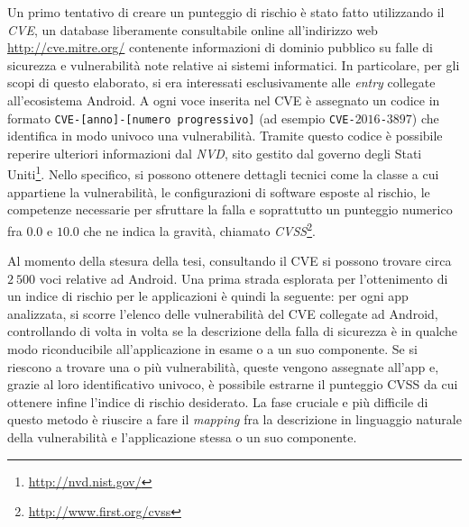 \documentclass[12pt,a4paper,oneside]{article}
\begin{document}
Un primo tentativo di creare un punteggio di rischio è stato fatto utilizzando il \textit{\gls{CVE}}, un database liberamente consultabile online all'indirizzo web \url{http://cve.mitre.org/} contenente informazioni di dominio pubblico su falle di sicurezza e vulnerabilità note relative ai sistemi informatici. In particolare, per gli scopi di questo elaborato, si era interessati esclusivamente alle \textit{entry} collegate all'ecosistema Android. A ogni voce inserita nel \gls{CVE} è assegnato un codice in formato \texttt{CVE-[anno]-[numero progressivo]} (ad esempio \texttt{CVE-$2016$-$3897$}) che identifica in modo univoco una vulnerabilità. Tramite questo codice è possibile reperire ulteriori informazioni dal \textit{\gls{NVD}}, sito gestito dal governo degli Stati Uniti\footnote{\url{http://nvd.nist.gov/}}. Nello specifico, si possono ottenere dettagli tecnici come la classe a cui appartiene la vulnerabilità, le configurazioni di software esposte al rischio, le competenze necessarie per sfruttare la falla e soprattutto un punteggio numerico fra $0.0$ e $10.0$ che ne indica la gravità, chiamato \textit{\gls{CVSS}}\footnote{\url{http://www.first.org/cvss}}.

Al momento della stesura della tesi, consultando il \gls{CVE} si possono trovare circa $2~500$ voci relative ad Android. Una prima strada esplorata per l'ottenimento di un indice di rischio per le applicazioni è quindi la seguente: per ogni app analizzata, si scorre l'elenco delle vulnerabilità del \gls{CVE} collegate ad Android, controllando di volta in volta se la descrizione della falla di sicurezza è in qualche modo riconducibile all'applicazione in esame o a un suo componente. Se si riescono a trovare una o più vulnerabilità, queste vengono assegnate all'app e, grazie al loro identificativo univoco, è possibile estrarne il punteggio \gls{CVSS} da cui ottenere infine l'indice di rischio desiderato. La fase cruciale e più difficile di questo metodo è riuscire a fare il \textit{mapping} fra la descrizione in linguaggio naturale della vulnerabilità e l'applicazione stessa o un suo componente.
\end{document}
